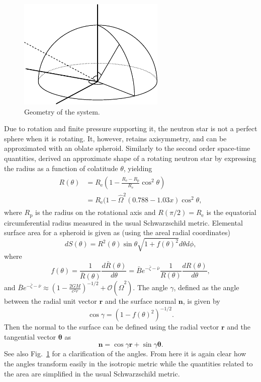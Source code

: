 \documentclass[iop, usenatbib]{emulateapj}
\newcommand{\be}{\begin{equation}}
\newcommand{\ee}{\end{equation}}
\renewcommand{\vec}[1]{\ensuremath{\boldsymbol{#1}}}
\newcommand{\Req}{\ensuremath{R_{\mathrm{e}}}}
\newcommand{\sch}{Schwarzschild }
\newcommand{\Ob}{\ensuremath{\hat{\Omega}}}
\newcommand{\nub}{\ensuremath{\bar{\nu}}}
\newcommand{\zetab}{\ensuremath{\bar{\zeta}}}
\newcommand{\Bb}{\ensuremath{\bar{B}}}
\begin{document}
\begin{figure}
\centering
\includegraphics[width=7cm]{figs/fig1.eps}
\caption{\label{fig:geom}
  Geometry of the system.
}
\end{figure}


Due to rotation and finite pressure supporting it, the neutron star is
not a perfect sphere when it is rotating.  It, however, retains
axisymmetry, and can be approximated with an oblate spheroid.  Similarly
to the second order space-time quantities,
\citet{aGM14} derived an approximate shape of a rotating neutron star by
expressing the radius as a function of colatitude $\theta$, yielding
\begin{align}\begin{split}\label{eq:radf}
    R(\theta) &= \Req \left( 1 - \frac{\Req - R_{\mathrm{p}}}{\Req} \cos^2\theta \right) \\
              &= \Req (1-\Ob^2 (0.788 - 1.03x) \cos^2 \theta,
\end{split}\end{align}
where $R_{\mathrm{p}}$ is the radius on the rotational axis and $R(\pi/2) = \Req$ is the equatorial circumferential radius measured in the usual \sch metric. 
Elemental surface area for a spheroid is given as (using the areal radial coordinates)
\be
dS(\theta) = R^2(\theta) \sin\theta \sqrt{1 + f(\theta)^2}d\theta d\phi,
\ee
where
\be
f(\theta) = \frac{1}{\bar{R}(\theta)} \frac{d \bar{R}(\theta)}{d \theta} 
= \Bb e^{-\zetab-\nub} \frac{1}{R(\theta)} \frac{dR(\theta)}{d\theta}, 
\ee
and $\Bb e^{-\zetab-\nub} \approx \left(1-\frac{2 G M}{c^2 r}\right)^{-1/2} + \mathcal{O}(\Ob^2)$.
The angle $\gamma$, defined as the angle between the radial unit vector
$\vec{r}$ and the surface normal $\vec{n}$, is given by
\be
\cos\gamma = \left(1 - f(\theta)^2\right)^{-1/2}.
\ee
Then the normal to the surface can be defined using the radial vector $\vec{r}$ and the tangential vector $\vec{\theta}$ as
\be
\vec{n} = \cos\gamma \vec{r} + \sin\gamma \vec{\theta}.
\ee
See also Fig.~\ref{fig:geom} for a clarification of the angles.
From here it is again clear how the angles transform easily in the isotropic metric while the quantities related to the area are simplified in the usual \sch metric.
\end{document}
